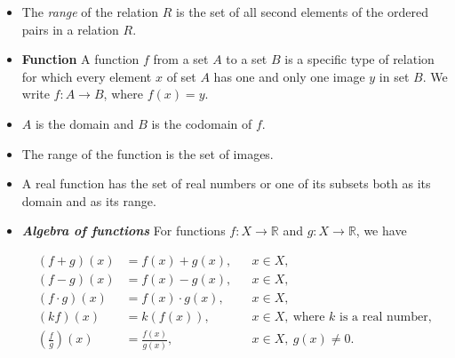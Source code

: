 \documentclass[11pt]{article}
\begin{document}
\begin{mdframed}
\begin{itemize}[label=$\diamond$]
\item The \textit{range} of the relation $R$ is the set of all second elements of
the ordered pairs in a relation $R$.

\item \textbf{Function}  
A function $f$ from a set $A$ to a set $B$ is a specific type of relation for which
every element $x$ of set $A$ has one and only one image $y$ in set $B$.  
We write $f : A \to B$, where $f(x) = y$.

\item $A$ is the domain and $B$ is the codomain of $f$.

\item The range of the function is the set of images.

\item A real function has the set of real numbers or one of its subsets both as
its domain and as its range.

\item \textbf{\textit{Algebra of functions}}  
For functions $f : X \to \mathbb{R}$ and $g : X \to \mathbb{R}$, we have

\[
\begin{aligned}
(f+g)(x) &= f(x) + g(x), && x \in X,\\
(f-g)(x) &= f(x) - g(x), && x \in X,\\
(f\cdot g)(x) &= f(x)\cdot g(x), && x \in X,\\
(kf)(x) &= k(f(x)), && x \in X,\ \text{where } k \text{ is a real number},\\
\left(\frac{f}{g}\right)(x) &= \frac{f(x)}{g(x)}, && x \in X,\ g(x) \neq 0.
\end{aligned}
\]

\end{itemize}

\end{mdframed}
\end{document}
